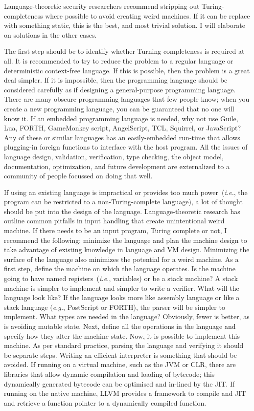\documentclass[letterpaper,twocolumn,10pt]{article}
\begin{document}
\noindent Language-theoretic security researchers recommend stripping out Turing-completeness where possible to avoid creating weird machines. If it can be replace with something static, this is the best, and most trivial solution. I will elaborate on solutions in the other cases.

The first step should be to identify whether Turning completeness is required at all. It is recommended to try to reduce the problem to a regular language or deterministic context-free language. If this is possible, then the problem is a great deal simpler. If it is impossible, then the programming language should be considered carefully as if designing a general-purpose programming language. There are many obscure programming languages that few people know; when you create a new programming language, you can be guaranteed that no one will know it.\cite{kws} If an embedded programming language is needed, why not use Guile, Lua, FORTH, GameMonkey script, AngelScript, TCL, Squirrel, or JavaScript? Any of these or similar languages has an easily-embedded run-time that allows plugging-in foreign functions to interface with the host program. All the issues of language design, validation, verification, type checking, the object model, documentation, optimization, and future development are externalized to a community of people focussed on doing that well.

If using an existing language is impractical or provides too much power~(\emph{i.e.}, the program can be restricted to a non-Turing-complete language), a lot of thought should be put into the design of the language. Language-theoretic research has outline common pitfalls in input handling that create unintentional weird machine.\cite{weird} If there needs to be an input program, Turing complete or not, I recommend the following: minimize the language and plan the machine design to take advantage of existing knowledge in language and VM design. Minimizing the surface of the language also minimizes the potential for a weird machine. As a first step, define the machine on which the language operates. Is the machine going to have named registers~(\emph{i.e.}, variables) or be a stack machine? A stack machine is simpler to implement and simpler to write a verifier. What will the language look like? If the language looks more like assembly language or like a stack language (\emph{e.g.}, PostScript or FORTH), the parser will be simpler to implement. What types are needed in the language? Obviously, fewer is better, as is avoiding mutable state. Next, define all the operations in the language and specify how they alter the machine state. Now, it is possible to implement this machine. As per standard practice, parsing the language and verifying it should be separate steps. Writing an efficient interpreter is something that should be avoided. If running on a virtual machine, such as the JVM or CLR, there are libraries that allow dynamic compilation and loading of bytecode; this dynamically generated bytecode can be optimised and in-lined by the JIT. If running on the native machine, LLVM provides a framework to compile and JIT and retrieve a function pointer to a dynamically compiled function.
\end{document}

